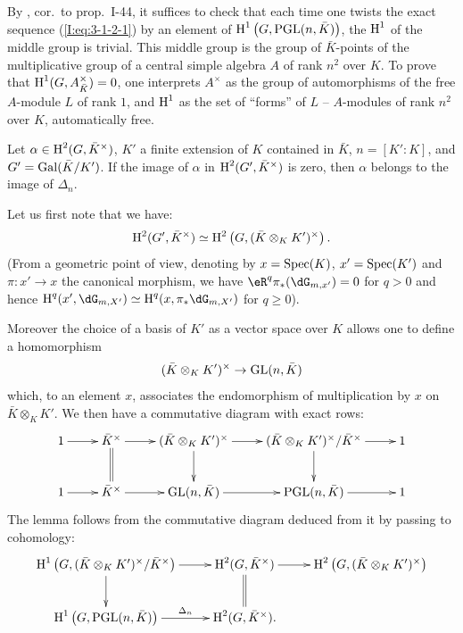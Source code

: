 By \cite{se94}, cor.\ to prop.\ I-44, it suffices to check that each
time one twists the exact sequence (\ref{I:eq:3-1-2-1}) by an element of
$\operatorname{H}^1\left(G,\operatorname{PGL}(n,\bar K)\right)$, the $\operatorname{H}^1$ of the middle group is trivial.
This middle group is the group of $\bar K$-points of the multiplicative group
of a central simple algebra $A$ of rank $n^2$ over $K$. To prove that
$\operatorname{H}^1(G,A_{\bar K}^\times) = 0$, one interprets $A^\times$ as the group
of automorphisms of the free $A$-module $L$ of rank $1$, and $\operatorname{H}^1$ as
the set of ``forms'' of $L$ -- $A$-modules of rank $n^2$ over $K$,
automatically free. 





\begin{lemma}\label{I:3-1-5}
Let $\alpha\in \operatorname{H}^2(G,\bar K^\times)$, $K'$ a finite extension of $K$
contained in $\bar K$, $n=[K':K]$, and $G'=\operatorname{Gal}(\bar K/K')$. If the image of
$\alpha$ in $\operatorname{H}^2(G',\bar K^\times)$ is zero, then $\alpha$ belongs
to the image of $\Delta_n$.
\end{lemma}

Let us first note that we have: 
\[
  \operatorname{H}^2(G',\bar K^\times) \simeq \operatorname{H}^2\left(G,(\bar K\otimes_K K')^\times\right)\text{.}
\]
(From a geometric point of view, denoting by $x=\operatorname{Spec}(K)$, $x'=\operatorname{Spec}(K')$ and
$\pi:x'\to x$ the canonical morphism, we have $\eR^q \pi_*(\dG_{m,x'}) = 0$ for
$q>0$ and hence $\h^q(x',\dG_{m,X'})\simeq \h^q(x,\pi_*\dG_{m,X'})$ for
$q\geqslant 0$).

Moreover the choice of a basis of $K'$ as a vector space over $K$
allows one to define a homomorphism
\[
  (\bar K\otimes_K K')^\times \to \operatorname{GL}(n,\bar K)
\]
which, to an element $x$, associates the endomorphism of
multiplication by $x$ on $\bar K\otimes_K K'$. We then have a commutative
diagram with exact rows: 
\[\xymatrix{
  1 \ar[r] 
    & \bar K^\times \ar[r] \ar@{=}[d]
    & (\bar K\otimes_K K')^\times \ar[r] \ar[d] 
    & (\bar K\otimes_K K')^\times / \bar K^\times \ar[r] \ar[d] 
    & 1 \\
  1 \ar[r] 
    & \bar K^\times \ar[r] 
    & \gl(n,\bar K) \ar[r] 
    & \pgl(n,\bar K) \ar[r] 
    & 1
}\]
The lemma follows from the commutative diagram deduced from it by passing
to cohomology:
\[\xymatrix{
  \h^1\left(G,(\bar K\otimes_K K')^\times/\bar K^\times\right) \ar[r] \ar[d] 
    & \h^2(G,\bar K^\times) \ar[r] \ar@{=}[d]
    & \h^2\left(G,(\bar K\otimes_K K')^\times\right) \\
  \h^1\left(G,\pgl(n,\bar K)\right) \ar[r]^-{\Delta_n} 
    & \h^2(G,\bar K^\times) \text{.}
}\]





